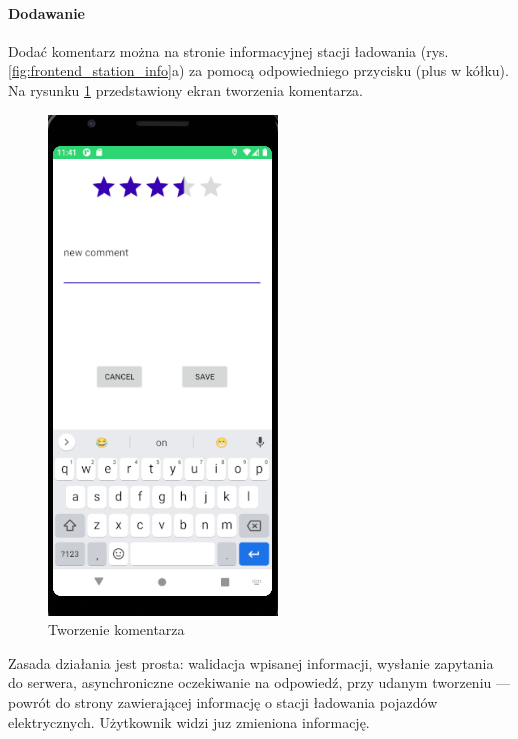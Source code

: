 \paragraph{Dodawanie\newline}
Dodać komentarz można na stronie informacyjnej stacji ładowania (rys. \ref{fig:frontend_station_info}a) za pomocą odpowiedniego przycisku (plus w kółku). Na rysunku \ref{fig:front_comment_create} przedstawiony ekran tworzenia komentarza.
\begin{figure}[ht]
    \centering
    \includegraphics[width=0.25\linewidth]{rys03/front_comment_create.png}
    \caption{Tworzenie komentarza}
    \label{fig:front_comment_create}
\end{figure}
Zasada działania jest prosta: walidacja wpisanej informacji, wysłanie zapytania do serwera, asynchroniczne oczekiwanie na odpowiedź, przy udanym tworzeniu — powrót do strony zawierającej informację o stacji ładowania pojazdów elektrycznych.
Użytkownik widzi juz zmieniona informację.